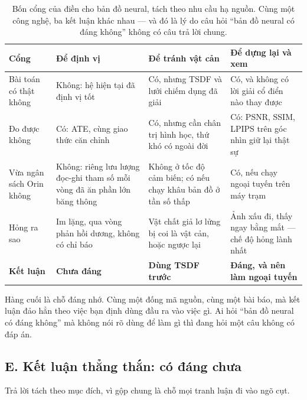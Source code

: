 \documentclass[../../deep_learning.tex]{subfiles}
\begin{document}
\begin{table}[H]\centering\footnotesize
\caption{Bốn cổng của  điền cho bản đồ neural, tách theo nhu cầu hạ nguồn. Cùng một công nghệ, ba kết luận khác nhau --- và đó là lý do câu hỏi ``bản đồ neural có đáng không'' không có câu trả lời chung.}
\label{tab:f32-gates}
\begin{tabularx}{\linewidth}{@{}L{2.6cm}YYY@{}}
\toprule
\textbf{Cổng} & \textbf{Để định vị} & \textbf{Để tránh vật cản} & \textbf{Để dựng lại và xem}\\
\midrule
Bài toán có thật không & Không: hệ hiện tại đã định vị tốt & Có, nhưng TSDF và lưới chiếm dụng đã giải & Có, và không có lời giải cổ điển nào thay được\\
Đo được không & Có: ATE, cùng giao thức căn chỉnh & Có, nhưng cần chân trị hình học, thứ khó có ngoài đời & Có: PSNR, SSIM, LPIPS trên góc nhìn giữ lại thật sự\\
Vừa ngân sách Orin không & Không: riêng lưu lượng đọc-ghi tham số mỗi vòng đã ăn phần lớn băng thông & Không ở tốc độ cảm biến; có nếu chạy khâu bản đồ ở tần số thấp & Có, nếu chạy ngoại tuyến trên máy trạm\\
Hỏng ra sao & Im lặng, qua vòng phản hồi dương, không có chỉ báo & Vật chất giả lơ lửng bị coi là vật cản, hoặc ngược lại & Ảnh xấu đi, thấy ngay bằng mắt --- chế độ hỏng lành nhất\\
\midrule
\textbf{Kết luận} & \textbf{Chưa đáng} & \textbf{Dùng TSDF trước} & \textbf{Đáng, và nên làm ngoại tuyến}\\
\bottomrule
\end{tabularx}
\end{table}

Hàng cuối là chỗ đáng nhớ. Cùng một đống mã nguồn, cùng một bài báo, mà kết luận đảo hẳn theo việc bạn định dùng đầu ra vào việc gì. Ai hỏi ``bản đồ neural có đáng không'' mà không nói rõ dùng để làm gì thì đang hỏi một câu không có đáp án.

\subsection{E. Kết luận thẳng thắn: có đáng chưa}
Trả lời tách theo mục đích, vì gộp chung là chỗ mọi tranh luận đi vào ngõ cụt.
\end{document}

